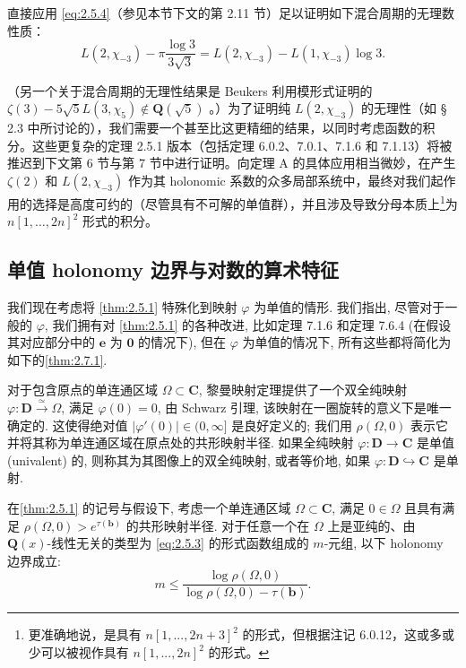 直接应用 \eqref{eq:2.5.4}（参见本节下文的第 2.11 节）足以证明如下混合周期的无理数性质：
\begin{equation*}
L(2,\chi_{-3}) - \pi \frac{\log 3}{3\sqrt{3}} = L(2,\chi_{-3}) - L(1,\chi_{-3}) \log 3.
\end{equation*}

（另一个关于混合周期的无理性结果是 Beukers 利用模形式证明的 $\zeta(3) - 5\sqrt{5} L(3, \chi_5) \notin \mathbf{Q}(\sqrt{5})$ \cite[Thm 4]{Beu87}。）为了证明纯 $L(2, \chi_{-3})$ 的无理性（如 § 2.3 中所讨论的），我们需要一个甚至比这更精细的结果，以同时考虑函数的积分。这些更复杂的定理 2.5.1 版本（包括定理 6.0.2、7.0.1、7.1.6 和 7.1.13）将被推迟到下文第 6 节与第 7 节中进行证明。向定理 A 的具体应用相当微妙，在产生 $\zeta(2)$ 和 $L(2, \chi_{-3})$ 作为其 holonomic 系数的众多局部系统中，最终对我们起作用的选择是高度可约的（尽管具有不可解的单值群），并且涉及导致分母本质上\footnote{更准确地说，是具有 $n[1, ..., 2n+3]^2$ 的形式，但根据注记 6.0.12，这或多或少可以被视作具有 $n[1, ..., 2n]^2$ 的形式。}为 $n[1, \ldots, 2n]^2$ 形式的积分。

\subsection{单值 holonomy 边界与对数的算术特征}\label{sec:2.7}

我们现在考虑将 \autoref{thm:2.5.1} 特殊化到映射 \(\varphi\) 为单值的情形. 我们指出, 尽管对于一般的 \(\varphi\), 我们拥有对 \autoref{thm:2.5.1} 的各种改进, 比如定理 7.1.6 和定理 7.6.4 (在假设其对应部分中的 $\mathbf{e}$ 为 $\mathbf{0}$ 的情况下), 但在 \(\varphi\) 为单值的情况下, 所有这些都将简化为如下的\autoref{thm:2.7.1}.

对于包含原点的单连通区域 \(\Omega \subset \mathbf{C}\), 黎曼映射定理提供了一个双全纯映射 \(\varphi : \mathbf{D} \xrightarrow{\simeq} \Omega\), 满足 \(\varphi(0) = 0\), 由 Schwarz 引理, 该映射在一圈旋转的意义下是唯一确定的. 这使得绝对值 \(\lvert\varphi'(0)\rvert \in (0,\infty]\) 是良好定义的; 我们用 \(\rho(\Omega,0)\) 表示它并将其称为单连通区域在原点处的共形映射半径. 如果全纯映射 \(\varphi : \mathbf{D} \to \mathbf{C}\) 是单值 (univalent) 的, 则称其为其图像上的双全纯映射, 或者等价地, 如果 \(\varphi : \mathbf{D} \hookrightarrow \mathbf{C}\) 是单射.

\begin{theorem}\label{thm:2.7.1}
在\autoref{thm:2.5.1} 的记号与假设下, 考虑一个单连通区域 \(\Omega \subset \mathbf{C}\), 满足 \(0 \in \Omega\) 且具有满足 \(\rho(\Omega,0) > e^{\tau(\mathbf{b})}\) 的共形映射半径. 对于任意一个在 \(\Omega\) 上是亚纯的、由 \(\mathbf{Q}(x)\)-线性无关的类型为 \eqref{eq:2.5.3} 的形式函数组成的 \(m\)-元组, 以下 holonomy 边界成立:
\[ m \le \frac{\log \rho(\Omega, 0)}{\log \rho(\Omega, 0) - \tau(\mathbf{b})}. \]
\end{theorem}

